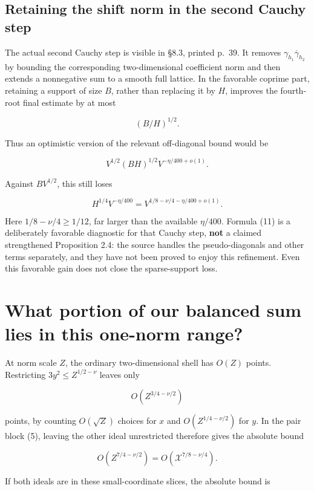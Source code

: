 \subsection{Retaining the shift norm in the second Cauchy
step}\label{retaining-the-shift-norm-in-the-second-cauchy-step}

The actual second Cauchy step is visible in §8.3, printed p.~39. It
removes \(\gamma_{h_1}\overline\gamma_{h_2}\) by bounding the
corresponding two-dimensional coefficient norm and then extends a
nonnegative sum to a smooth full lattice. In the favorable coprime part,
retaining a support of size \(B\), rather than replacing it by \(H\),
improves the fourth-root final estimate by at most

\[
(B/H)^{1/2}.
\]

Thus an optimistic version of the relevant off-diagonal bound would be

\[
V^{1/2}(BH)^{1/2}V^{-\eta/400+o(1)}.
\tag{11}
\]

Against \(BV^{1/2}\), this still loses

\[
H^{1/4}V^{-\eta/400}
=V^{1/8-\nu/4-\eta/400+o(1)}.
\tag{12}
\]

Here \(1/8-\nu/4\ge1/12\), far larger than the available \(\eta/400\).
Formula (11) is a deliberately favorable diagnostic for that Cauchy
step, \textbf{not} a claimed strengthened Proposition 2.4: the source
handles the pseudo-diagonals and other terms separately, and they have
not been proved to enjoy this refinement. Even this favorable gain does
not close the sparse-support loss.

\section{What portion of our balanced sum lies in this one-norm
range?}\label{what-portion-of-our-balanced-sum-lies-in-this-one-norm-range}

At norm scale \(Z\), the ordinary two-dimensional shell has \(O(Z)\)
points. Restricting \(3y^2\le Z^{1/2-\nu}\) leaves only

\[
O(Z^{3/4-\nu/2})
\]

points, by counting \(O(\sqrt Z)\) choices for \(x\) and
\(O(Z^{1/4-\nu/2})\) for \(y\). In the pair block (5), leaving the other
ideal unrestricted therefore gives the absolute bound

\[
O(Z^{7/4-\nu/2})
=O(\mathcal X^{7/8-\nu/4}).
\tag{13}
\]

If both ideals are in these small-coordinate slices, the absolute bound
is

